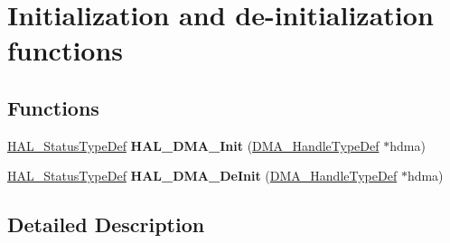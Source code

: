 \hypertarget{group___d_m_a___exported___functions___group1}{\section{Initialization and de-\/initialization functions}
\label{group___d_m_a___exported___functions___group1}
}
\subsection*{Functions}
\begin{DoxyCompactItemize}
\item 
\hypertarget{group___d_m_a___exported___functions___group1_ga0fbcb690074233a03f2fa366dc22ff01}{\hyperlink{stm32l1xx__hal__def_8h_a63c0679d1cb8b8c684fbb0632743478f}{H\-A\-L\-\_\-\-Status\-Type\-Def} {\bfseries H\-A\-L\-\_\-\-D\-M\-A\-\_\-\-Init} (\hyperlink{group___d_m_a___exported___types_ga92b907d56a9c29b93d46782a7a04f91e}{D\-M\-A\-\_\-\-Handle\-Type\-Def} $\ast$hdma)}\label{group___d_m_a___exported___functions___group1_ga0fbcb690074233a03f2fa366dc22ff01}

\item 
\hypertarget{group___d_m_a___exported___functions___group1_ga7bb8587d642da11252a97f5c41c389ef}{\hyperlink{stm32l1xx__hal__def_8h_a63c0679d1cb8b8c684fbb0632743478f}{H\-A\-L\-\_\-\-Status\-Type\-Def} {\bfseries H\-A\-L\-\_\-\-D\-M\-A\-\_\-\-De\-Init} (\hyperlink{group___d_m_a___exported___types_ga92b907d56a9c29b93d46782a7a04f91e}{D\-M\-A\-\_\-\-Handle\-Type\-Def} $\ast$hdma)}\label{group___d_m_a___exported___functions___group1_ga7bb8587d642da11252a97f5c41c389ef}

\end{DoxyCompactItemize}


\subsection{Detailed Description}
